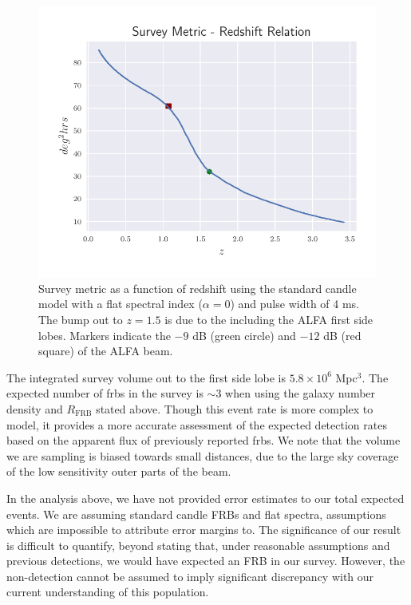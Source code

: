 \documentclass[a4paper,fleqn,usenatbib]{mnras}
\begin{document}
\begin{figure}
    \includegraphics[width=1.0\linewidth]{figures/full_sefd_z_relation.pdf}
    \caption{Survey metric as a function of redshift using the standard candle
    model with a flat spectral index ($\alpha=0$) and pulse width of 4 ms. The
    bump out to $z=1.5$ is due to the including the ALFA first side lobes.
    Markers indicate the $-9$ dB (green circle) and $-12$ dB (red square) of the
    ALFA beam.
    }
    \label{fig:full_sefd_z}
\end{figure}

The integrated survey volume out to the first side lobe is $5.8 \times
10^6$ Mpc$^3$. The expected number of \glspl{frb} in the survey is
$\sim 3$ when using the galaxy number density and $R_{\textrm{FRB}}$
stated above. Though this event rate is more complex to model, it
provides a more accurate assessment of the expected detection rates
based on the apparent flux of previously reported \glspl{frb}. We note
that the volume we are sampling is biased towards small distances, due
to the large sky coverage of the low sensitivity outer parts of the
beam.


In the analysis above, we have not provided error estimates to our
total expected events. We are assuming standard candle FRBs and flat
spectra, assumptions which are impossible to attribute error margins
to. The significance of our result is difficult to quantify, beyond
stating that, under reasonable assumptions and previous detections, we
would have expected an FRB in our survey. However, the non-detection
cannot be assumed to imply significant discrepancy with our current
understanding of this population.
\end{document}
